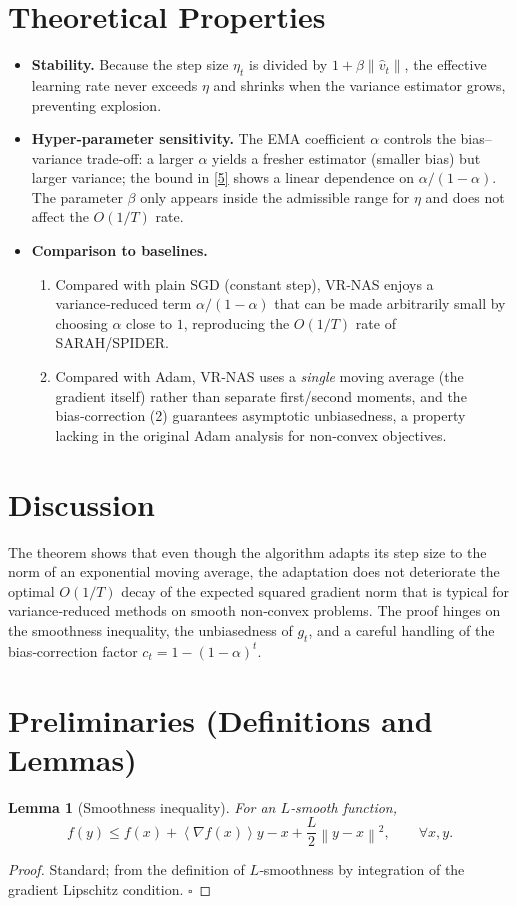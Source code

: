 \documentclass{article}
\newtheorem{lemma}{Lemma}
\newcommand{\norm}[1]{\left\|#1\right\|}
\newcommand{\inner}[1]{\left\langle #1 \right\rangle}
\newcommand{\grad}{\nabla}
\begin{document}
\section*{Theoretical Properties}
\begin{itemize}[leftmargin=*]
\item \textbf{Stability.} Because the step size $\eta_{t}$ is divided by $1+\beta\norm{\hat v_{t}}$, the effective learning rate never exceeds $\eta$ and shrinks when the variance estimator grows, preventing explosion.
\item \textbf{Hyper‑parameter sensitivity.} The EMA coefficient $\alpha$ controls the bias–variance trade‑off: a larger $\alpha$ yields a fresher estimator (smaller bias) but larger variance; the bound in \eqref{5} shows a linear dependence on $\alpha/(1-\alpha)$. The parameter $\beta$ only appears inside the admissible range for $\eta$ and does not affect the $O(1/T)$ rate.
\item \textbf{Comparison to baselines.}
    \begin{enumerate}
    \item Compared with plain SGD (constant step), VR‑NAS enjoys a variance‑reduced term $\alpha/(1-\alpha)$ that can be made arbitrarily small by choosing $\alpha$ close to $1$, reproducing the $O(1/T)$ rate of SARAH/SPIDER.
    \item Compared with Adam, VR‑NAS uses a \emph{single} moving average (the gradient itself) rather than separate first/second moments, and the bias‑correction (2) guarantees asymptotic unbiasedness, a property lacking in the original Adam analysis for non‑convex objectives.
    \end{enumerate}
\end{itemize}

\section*{Discussion}
The theorem shows that even though the algorithm adapts its step size to the norm of an exponential moving average, the adaptation does not deteriorate the optimal $O(1/T)$ decay of the expected squared gradient norm that is typical for variance‑reduced methods on smooth non‑convex problems. The proof hinges on the smoothness inequality, the unbiasedness of $g_{t}$, and a careful handling of the bias‑correction factor $c_{t}=1-(1-\alpha)^{t}$.

\section*{Preliminaries (Definitions and Lemmas)}
\begin{lemma}[Smoothness inequality]\label{lem:smooth}
For an $L$‑smooth function,
\[
f(y) \le f(x) + \inner{\grad f(x)}{y-x} + \frac{L}{2}\norm{y-x}^{2},
\qquad\forall x,y.
\]
\end{lemma}
\begin{proof}
Standard; from the definition of $L$‑smoothness by integration of the gradient Lipschitz condition. \hfill $\square$
\end{proof}
\end{document}
